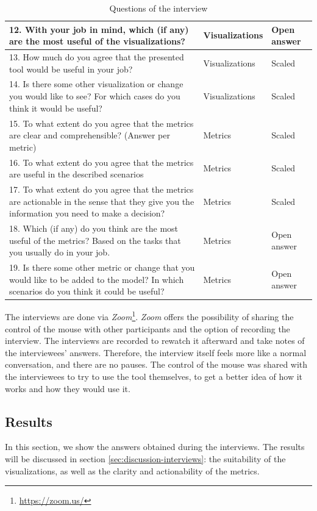\begin{table}[p]
\begin{center}
\begin{tabularx}{\textwidth}{|X|l|l|}
    12.	With your job in mind, which (if any) are the most useful of the visualizations? & Visualizations & Open answer \\\hline
    13.	How much do you agree that the presented tool would be useful in your job? & Visualizations & Scaled \\\hline
    14.	Is there some other visualization or change you would like to see? For which cases do you think it would be useful? & Visualizations & Scaled \\\hline
    \hline
    15.	To what extent do you agree that the metrics are clear and comprehensible? (Answer per metric) & Metrics & Scaled \\\hline
    16.	To what extent do you agree that the metrics are useful in the described scenarios & Metrics & Scaled \\\hline
    17.	To what extent do you agree that the metrics are actionable in the sense that they give you the information you need to make a decision? & Metrics & Scaled \\\hline
    18.	Which (if any) do you think are the most useful of the metrics? Based on the tasks that you usually do in your job. & Metrics & Open answer \\\hline
    19.	Is there some other metric or change that you would like to be added to the model? In which scenarios do you think it could be useful? & Metrics & Open answer \\\hline
    \end{tabularx}
    \end{center}
    \caption{Questions of the interview}
    \label{table:interview-questions}
\end{table}

The interviews are done via \textit{Zoom}\footnote{\url{https://zoom.us/}}. \textit{Zoom} offers the possibility of sharing the control of the mouse with other participants and the option of recording the interview. The interviews are recorded to rewatch it afterward and take notes of the interviewees' answers. Therefore, the interview itself feels more like a normal conversation, and there are no pauses. The control of the mouse was shared with the interviewees to try to use the tool themselves, to get a better idea of how it works and how they would use it.

\subsection{Results}
In this section, we show the answers obtained during the interviews. The results will be discussed in section \ref{sec:discussion-interviews}: the suitability of the visualizations, as well as the clarity and actionability of the metrics.

